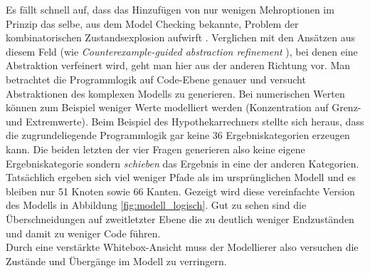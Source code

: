 Es fällt schnell auf, dass das Hinzufügen von nur wenigen Mehroptionen im Prinzip das selbe, aus dem Model Checking bekannte, Problem der kombinatorischen Zustandsexplosion aufwirft \cite{clarke_model_2012}. Verglichen mit den Ansätzen aus diesem Feld (wie \textit{Counterexample-guided abstraction refinement} \cite{clarke_counterexample-guided_2000}), bei denen eine Abstraktion verfeinert wird, geht man hier aus der anderen Richtung vor. Man betrachtet die Programmlogik auf Code-Ebene genauer und versucht Abstraktionen des komplexen Modells zu generieren. Bei numerischen Werten können zum Beispiel weniger Werte modelliert werden (Konzentration auf Grenz- und Extremwerte). Beim Beispiel des Hypothekarrechners stellte sich heraus, dass die zugrundeliegende Programmlogik gar keine 36 Ergebniskategorien erzeugen kann. Die beiden letzten der vier Fragen generieren also keine eigene Ergebniskategorie sondern \textit{schieben} das Ergebnis in eine der anderen Kategorien. Tatsächlich ergeben sich viel weniger Pfade als im ursprünglichen Modell und es bleiben nur 51 Knoten sowie 66 Kanten. Gezeigt wird diese vereinfachte Version des Modells in Abbildung \ref{fig:modell_logisch}. Gut zu sehen sind die Überschneidungen auf zweitletzter Ebene die zu deutlich weniger Endzuständen und damit zu weniger Code führen.\\
Durch eine verstärkte Whitebox-Ansicht muss der Modellierer also versuchen die  Zustände und Übergänge im Modell zu verringern.




